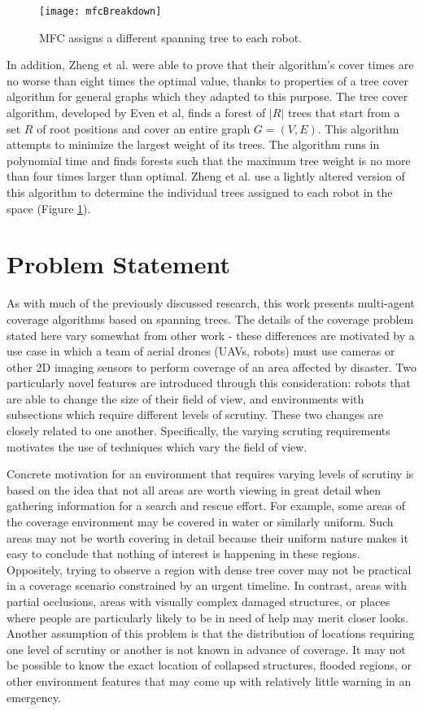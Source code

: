 \begin{figure}[H]
\texttt{[image: mfcBreakdown]}
\caption[Multi-Robot Forest Coverage Path Creation]{MFC assigns a different spanning tree to each robot.}
\label {fig:MRCPaths}
\end{figure}

In addition, Zheng et al. were able to prove that their algorithm's cover times are no worse than eight times the optimal value, thanks to properties of a tree cover algorithm for general graphs which they adapted to this purpose. The tree cover algorithm, developed by Even et al, finds a forest of $|R|$ trees that start from a set $R$ of root positions and cover an entire graph $G = (V, E)$. This algorithm attempts to minimize the largest weight of its trees. The algorithm runs in polynomial time and finds forests such that the maximum tree weight is no more than four times larger than optimal. Zheng et al. use a lightly altered version of this algorithm to determine the individual trees assigned to each robot in the space (Figure \ref{fig:MRCPaths}). 

\section{Problem Statement}

As with much of the previously discussed research, this work presents multi-agent coverage algorithms based on spanning trees. The details of the coverage problem stated here vary somewhat from other work - these differences are motivated by a use case in which a team of aerial drones (UAVs, robots) must use cameras or other 2D imaging sensors to perform coverage of an area affected by disaster. Two particularly novel features are introduced through this consideration: robots that are able to change the size of their field of view, and environments with subsections which require different levels of scrutiny. These two changes are closely related to one another. Specifically, the varying scruting requirements motivates the use of techniques which vary the field of view.

Concrete motivation for an environment that requires varying levels of scrutiny is based on the idea that not all areas are worth viewing in great detail when gathering information for a search and rescue effort. For example, some areas of the coverage environment may be covered in water or similarly uniform. Such areas may not be worth covering in detail because their uniform nature makes it easy to conclude that nothing of interest is happening in these regions. Oppositely, trying to observe a region with dense tree cover may not be practical in a coverage scenario constrained by an urgent timeline. In contrast, areas with partial occlusions, areas with visually complex damaged structures, or places where people are particularly likely to be in need of help may merit closer looks. Another assumption of this problem is that the distribution of locations requiring one level of scrutiny or another is not known in advance of coverage. It may not be possible to know the exact location of collapsed structures, flooded regions, or other environment features that may come up with relatively little warning in an emergency.

